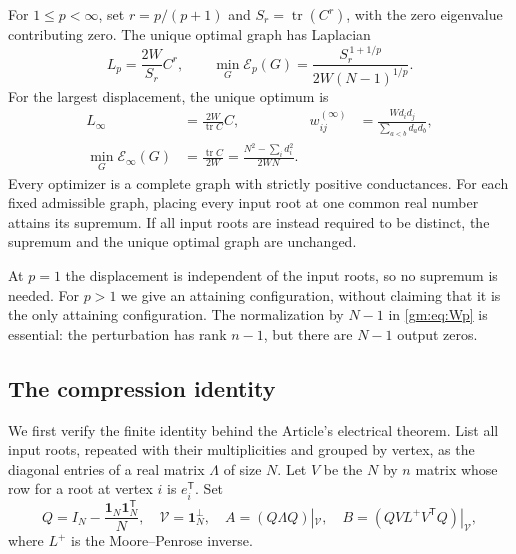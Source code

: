 \begin{theorem}\label{gm:thm:main}
For $1\le p<\infty$, set $r=p/(p+1)$ and $S_r=\operatorname{tr}(C^r)$,
with the zero eigenvalue contributing zero. The unique optimal graph has
Laplacian
\begin{equation}\label{gm:eq:optimalL}
 L_p=\frac{2W}{S_r}C^r,
 \qquad
 \min_G\mathcal E_p(G)=
 \frac{S_r^{\,1+1/p}}{2W(N-1)^{1/p}}.
\end{equation}
For the largest displacement, the unique optimum is
\begin{align}
 L_\infty&=\frac{2W}{\operatorname{tr}C}C,
 &w_{ij}^{(\infty)}&=
 \frac{W d_i d_j}{\sum_{a<b}d_a d_b},\label{gm:eq:infinity}\\
 \min_G\mathcal E_\infty(G)&=
 \frac{\operatorname{tr}C}{2W}
 =\frac{N^2-\sum_i d_i^2}{2WN}.\nonumber
\end{align}
Every optimizer is a complete graph with strictly positive conductances.
For each fixed admissible graph, placing every input root at one common real
number attains its supremum. If all input roots are instead required to be
distinct, the supremum and the unique optimal graph are unchanged.
\end{theorem}

At $p=1$ the displacement is independent of the input roots, so no supremum
is needed. For $p>1$ we give an attaining configuration, without claiming that
it is the only attaining configuration. The normalization by $N-1$ in
\eqref{gm:eq:Wp} is essential: the perturbation has rank $n-1$, but there are
$N-1$ output zeros.

\subsection{The compression identity}

We first verify the finite identity behind the Article's electrical theorem.
List all input roots, repeated with their multiplicities and grouped by
vertex, as the diagonal entries of a real matrix $\Lambda$ of size $N$.
Let $V$ be the $N$ by $n$ matrix whose row for a root at vertex $i$ is $e_i^{\mathsf T}$.
Set
\begin{equation}\label{gm:eq:compression-data}
 Q=I_N-\frac{\mathbf1_N\mathbf1_N^{\mathsf T}}N,\quad
 \mathcal V=\mathbf1_N^\perp,\quad
 A=(Q\Lambda Q)|_{\mathcal V},\quad
 B=(QVL^+V^{\mathsf T}Q)|_{\mathcal V},
\end{equation}
where $L^+$ is the Moore--Penrose inverse.

